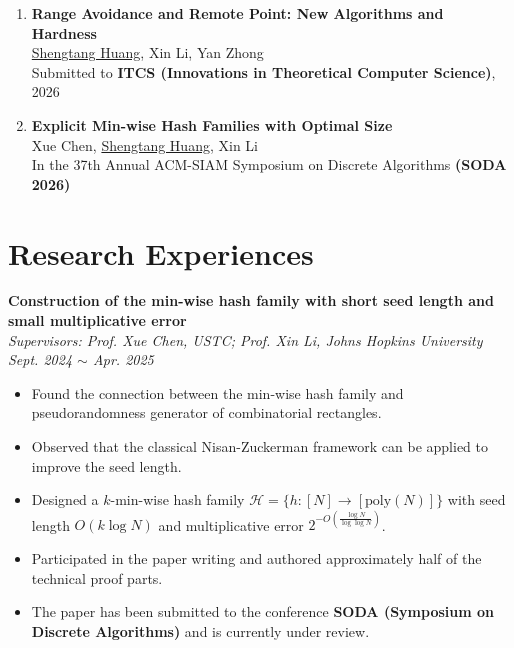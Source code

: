 \documentclass[a4paper,12pt]{ctexart}
\begin{document}
\begin{enumerate}
    \item \textbf{Range Avoidance and Remote Point: New Algorithms and Hardness} \\
           \underline{Shengtang Huang}, Xin Li, Yan Zhong \\
           Submitted to \textbf{ITCS (Innovations in Theoretical Computer Science)}, 2026

    \item \textbf{Explicit Min-wise Hash Families with Optimal Size} \\
           Xue Chen, \underline{Shengtang Huang}, Xin Li \\
           In the 37th Annual ACM-SIAM Symposium on Discrete Algorithms \textbf{(SODA 2026)}
\end{enumerate}



\section{\textbf{Research Experiences}}

\textbf{Construction of the min-wise hash family with short seed length and small multiplicative error} \\
\textit{Supervisors: Prof. Xue Chen, USTC; Prof. Xin Li, Johns Hopkins University \hfill Sept. 2024 $\sim$ Apr. 2025}  \vspace{-0.1cm}
\begin{itemize}
    \item Found the connection between the min-wise hash family and pseudorandomness generator of combinatorial rectangles.  \vspace{-0.25cm}
    \item Observed that the classical Nisan-Zuckerman framework can be applied to improve the seed length.  \vspace{-0.25cm}
    \item Designed a $k$-min-wise hash family $\mathcal{H} = \{h : [N] \to [\mathrm{poly}(N)]\}$ with seed length $O(k \log N)$ and multiplicative error $2^{-O\left(\frac{\log N}{\log \log N}\right)}$.  \vspace{-0.25cm}
    \item Participated in the paper writing and authored approximately half of the technical proof parts.  \vspace{-0.25cm}
    \item The paper has been submitted to the conference \textbf{SODA (Symposium on Discrete Algorithms)} and is currently under review.
\end{itemize}
\end{document}
